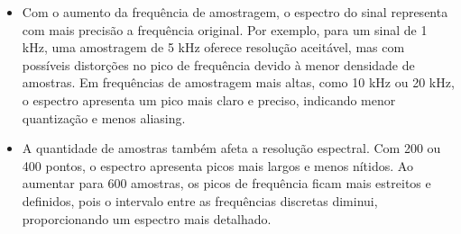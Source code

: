 \begin{itemize}
    \item Com o aumento da frequência de amostragem, o espectro do sinal representa com mais precisão a frequência original. Por exemplo, para um sinal de 1 kHz, uma amostragem de 5 kHz oferece resolução aceitável, mas com possíveis distorções no pico de frequência devido à menor densidade de amostras. Em frequências de amostragem mais altas, como 10 kHz ou 20 kHz, o espectro apresenta um pico mais claro e preciso, indicando menor quantização e menos aliasing.
    
    \item A quantidade de amostras também afeta a resolução espectral. Com 200 ou 400 pontos, o espectro apresenta picos mais largos e menos nítidos. Ao aumentar para 600 amostras, os picos de frequência ficam mais estreitos e definidos, pois o intervalo entre as frequências discretas diminui, proporcionando um espectro mais detalhado.
\end{itemize}
